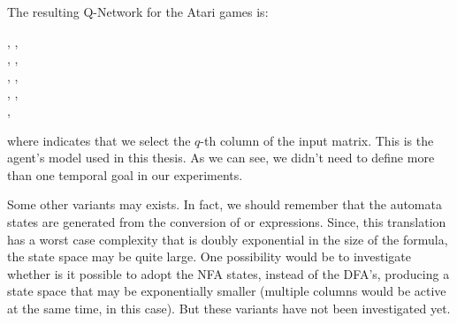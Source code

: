 The resulting Q-Network for the Atari games is:
\begin{center}
	, \relu{}, \\
	, \relu{}, \\
	, \relu{}, \\
	, \relu{}, \\
	, \\
\end{center}
where  indicates that we select the $q$-th column of
the input matrix. This is the agent's model used in this thesis. As we can
see, we didn't need to define more than one temporal goal in our experiments.

Some other variants may exists. In fact, we should remember that the automata
states are generated from the conversion of  \ldl{} or \ltl{} expressions.
Since, this translation has a worst case complexity that is doubly exponential
in the size of the formula, the state space may be quite large. One
possibility would be to investigate whether is it possible to adopt the NFA
states, instead of the DFA's, producing a state space that may be
exponentially smaller (multiple columns would be active at the same time, in
this case). But these variants have not been investigated yet.
